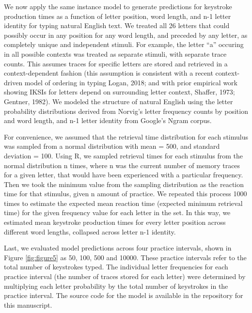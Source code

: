 \documentclass[,man,floatsintext]{apa6}
\begin{document}
We now apply the same instance model to generate predictions for keystroke production times as a function of letter position, word length, and n-1 letter identity for typing natural English text. We treated all 26 letters that could possibly occur in any position for any word length, and preceded by any letter, as completely unique and independent stimuli. For example, the letter \enquote{a} occuring in all possible contexts was treated as separate stimuli, with separate trace counts. This assumes traces for specific letters are stored and retrieved in a context-dependent fashion (this assumption is consistent with a recent context-driven model of ordering in typing Logan, 2018; and with prior empirical work showing IKSIs for letters depend on surrounding letter context, Shaffer, 1973; Gentner, 1982). We modeled the structure of natural English using the letter probability distributions derived from Norvig's letter frequency counts by position and word length, and n-1 letter identity from Google's Ngram corpus.

For convenience, we assumed that the retrieval time distribution for each stimulus was sampled from a normal distribution with mean = 500, and standard deviation = 100. Using R, we sampled retrieval times for each stimulus from the normal distribution n times, where n was the current number of memory traces for a given letter, that would have been experienced with a particular frequency. Then we took the minimum value from the sampling distribution as the reaction time for that stimulus, given n amount of practice. We repeated this process 1000 times to estimate the expected mean reaction time (expected minimum retrieval time) for the given frequency value for each letter in the set. In this way, we estimated mean keystroke production times for every letter position across different word lengths, collapsed across letter n-1 identity.

Last, we evaluated model predictions across four practice intervals, shown in Figure \ref{fig:figure5} as 50, 100, 500 and 10000. These practice intervals refer to the total number of keystrokes typed. The individual letter frequencies for each practice interval (the number of traces stored for each letter) were determined by multiplying each letter probability by the total number of keystrokes in the practice interval. The source code for the model is available in the repository for this manuscript.
\end{document}
